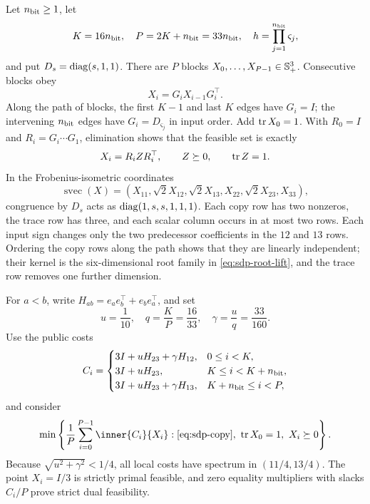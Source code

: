Let $n_{\rm bit}\geq1$, let
\begin{equation}
 K=16n_{\rm bit},\quad P=2K+n_{\rm bit}=33n_{\rm bit},
 \quad h=\prod_{j=1}^{n_{\rm bit}}\varsigma_j,
 \label{eq:sdp-intrinsic-parameters}
\end{equation}
and put $D_s=\operatorname{diag}(s,1,1)$.  There are $P$ blocks
$X_0,\ldots,X_{P-1}\in\mathbb{S}_{+}^3$.  Consecutive blocks obey
\begin{equation}
 X_i=G_iX_{i-1}G_i^\top.                         \label{eq:sdp-copy}
\end{equation}
Along the path of blocks, the first $K-1$ and last $K$ edges
have $G_i=I$; the intervening $n_{\rm bit}$ edges have $G_i=D_{\varsigma_j}$
in input order.  Add $\operatorname{tr} X_0=1$.  With $R_0=I$ and $R_i=G_i\cdots G_1$,
elimination shows that the feasible set is exactly
\begin{equation}
 X_i=R_iZR_i^\top,\qquad Z\succeq0,\qquad\operatorname{tr} Z=1.              \label{eq:sdp-root-lift}
\end{equation}
In the Frobenius-isometric coordinates
\begin{equation}
 \operatorname{svec}(X)=(X_{11},\sqrt2X_{12},\sqrt2X_{13},
                          X_{22},\sqrt2X_{23},X_{33}),       \label{eq:sdp-svec}
\end{equation}
congruence by $D_s$ acts as $\operatorname{diag}(1,s,s,1,1,1)$.  Each copy row
has two nonzeros, the trace row has three, and each scalar column occurs in
at most two rows.  Each input sign changes only the two predecessor
coefficients in the $12$ and $13$ rows.  Ordering the copy rows along the
path shows that they are linearly independent; their kernel is the six-dimensional
root family in \eqref{eq:sdp-root-lift}, and the trace row removes one
further dimension.

For $a<b$, write $H_{ab}=e_ae_b^\top+e_be_a^\top$, and set
\begin{equation}
 u=\frac1{10},\quad q=\frac KP=\frac{16}{33},\quad
 \gamma=\frac uq=\frac{33}{160}.                           \label{eq:sdp-anisotropy}
\end{equation}
Use the public costs
\begin{equation}
 C_i=\begin{cases}
  3I+uH_{23}+\gamma H_{12},&0\leq i<K,\\
  3I+uH_{23},&K\leq i<K+n_{\rm bit},\\
  3I+uH_{23}+\gamma H_{13},&K+n_{\rm bit}\leq i<P,
 \end{cases}                                                \label{eq:sdp-local-costs}
\end{equation}
and consider
\begin{equation}
 \min\left\{\frac1P\sum_{i=0}^{P-1}\inner{C_i}{X_i}:
       \eqref{eq:sdp-copy},\ \tr X_0=1,\ X_i\succeq0\right\}.
 \label{eq:sdp-intrinsic-program}
\end{equation}
Because $\sqrt{u^2+\gamma^2}<1/4$, all local costs have spectrum in
$(11/4,13/4)$.  The point $X_i=I/3$ is strictly primal feasible, and zero
equality multipliers with slacks $C_i/P$ prove strict dual feasibility.

